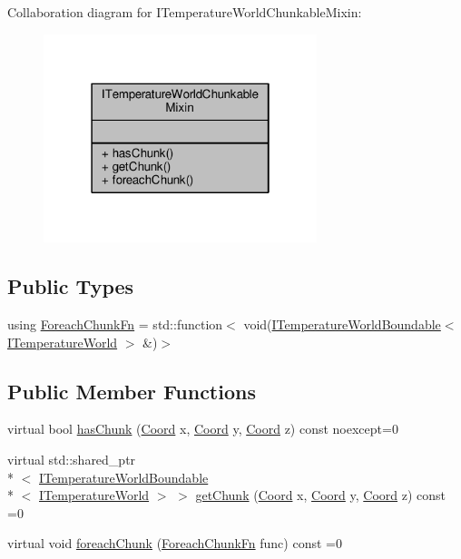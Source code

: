 Collaboration diagram for I\-Temperature\-World\-Chunkable\-Mixin\-:
\nopagebreak
\begin{figure}[H]
\begin{center}
\leavevmode
\includegraphics[width=226pt]{class_i_temperature_world_chunkable_mixin__coll__graph}
\end{center}
\end{figure}
\subsection*{Public Types}
\begin{DoxyCompactItemize}
\item 
using \hyperlink{class_i_temperature_world_chunkable_mixin_a9454e8c3813367f13da22c894c1052ed}{Foreach\-Chunk\-Fn} = std\-::function$<$ void(\hyperlink{class_i_temperature_world_boundable}{I\-Temperature\-World\-Boundable}$<$ \hyperlink{class_i_temperature_world}{I\-Temperature\-World} $>$ \&)$>$
\end{DoxyCompactItemize}
\subsection*{Public Member Functions}
\begin{DoxyCompactItemize}
\item 
virtual bool \hyperlink{class_i_temperature_world_chunkable_mixin_a4694b473f4e20976b8a538d16656943d}{has\-Chunk} (\hyperlink{struct_coord}{Coord} x, \hyperlink{struct_coord}{Coord} y, \hyperlink{struct_coord}{Coord} z) const noexcept=0
\item 
virtual std\-::shared\-\_\-ptr\\*
$<$ \hyperlink{class_i_temperature_world_boundable}{I\-Temperature\-World\-Boundable}\\*
$<$ \hyperlink{class_i_temperature_world}{I\-Temperature\-World} $>$ $>$ \hyperlink{class_i_temperature_world_chunkable_mixin_aacb0fa709dbd3cb5d630dde64afec5b6}{get\-Chunk} (\hyperlink{struct_coord}{Coord} x, \hyperlink{struct_coord}{Coord} y, \hyperlink{struct_coord}{Coord} z) const =0
\item 
virtual void \hyperlink{class_i_temperature_world_chunkable_mixin_a2ded37900a83bdac968ff0f07f315225}{foreach\-Chunk} (\hyperlink{class_i_temperature_world_chunkable_mixin_a9454e8c3813367f13da22c894c1052ed}{Foreach\-Chunk\-Fn} func) const =0
\end{DoxyCompactItemize}


